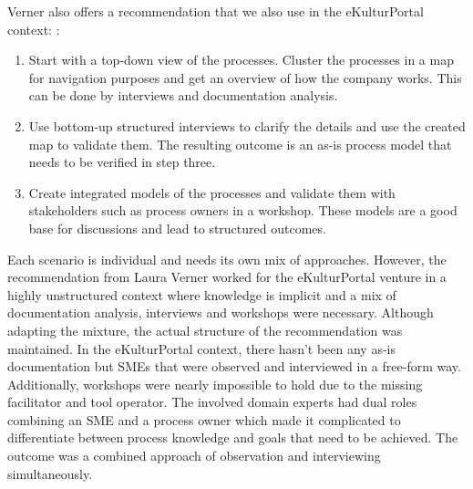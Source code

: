 Verner also offers a recommendation that we also use in the eKulturPortal context: \cite{Verner2004}: 
\begin{enumerate}
\item Start with a top-down view of the processes. Cluster the processes in a map for navigation purposes and get an overview of how the company works. This can be done by interviews and documentation analysis. 
\item Use bottom-up structured interviews to clarify the details and use the created map to validate them. The resulting outcome is an as-is process model that needs to be verified in step three.
\item Create integrated models of the processes and validate them with stakeholders such as process owners in a workshop. These models are a good base for discussions and lead to structured outcomes. 
\end{enumerate}

Each scenario is individual and needs its own mix of approaches. However, the recommendation from Laura Verner worked for the eKulturPortal venture in a highly unstructured context where knowledge is implicit and a mix of documentation analysis, interviews and workshops were necessary. Although adapting the mixture, the actual structure of the recommendation was maintained. In the eKulturPortal context, there hasn't been any as-is documentation but SMEs that were observed and interviewed in a free-form way. Additionally, workshops were nearly impossible to hold due to the missing facilitator and tool operator. The involved domain experts had dual roles combining an SME and a process owner which made it complicated to differentiate between process knowledge and goals that need to be achieved. 
The outcome was a combined approach of observation and interviewing simultaneously. 

